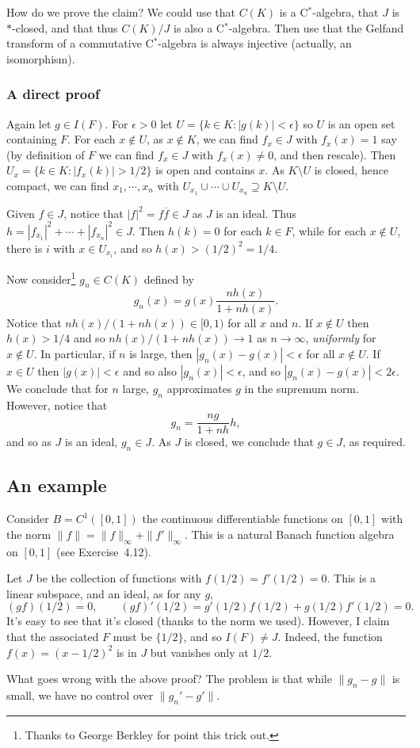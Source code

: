 \documentclass[twoside,12pt,a4paper]{article}
\theoremstyle{plain}
\theoremstyle{definition}
\begin{document}
How do we prove the claim?  We could use that $C(K)$ is a C$^*$-algebra,
that $J$ is $*$-closed, and that thus $C(K)/J$ is also a C$^*$-algebra.
Then use that the Gelfand transform of a commutative C$^*$-algebra is
always injective (actually, an isomorphism).

\subsubsection{A direct proof}

Again let $g\in I(F)$.  For $\epsilon>0$ let $U=\{ k\in K : |g(k)|<\epsilon\}$
so $U$ is an open set containing $F$.  For each $x\not\in U$, as $x\not\in K$,
we can find $f_x\in J$ with $f_x(x)=1$ say (by definition of $F$ we can find
$f_x\in J$ with $f_x(x)\not=0$, and then rescale).  Then $U_x=\{ k\in K:
|f_x(k)|>1/2 \}$ is open and contains $x$.  As $K\setminus U$ is
closed, hence compact, we can find $x_1,\cdots,x_n$ with $U_{x_1}\cup
\cdots\cup U_{x_n} \supseteq K\setminus U$.

Given $f\in J$, notice that $|f|^2 = f \overline{f} \in J$ as $J$ is an ideal.
Thus $h = |f_{x_1}|^2 + \cdots + |f_{x_n}|^2\in J$.  Then $h(k)=0$ for each
$k\in F$, while for each $x\not\in U$, there is $i$ with $x\in U_{x_i}$, and so
$h(x)>(1/2)^2 = 1/4$.  

Now consider\footnote{Thanks to George Berkley for point this trick out.}
$g_n\in C(K)$ defined by
\[ g_n(x) = g(x) \frac{n h(x)}{1+nh(x)}. \]
Notice that $nh(x)/(1+nh(x)) \in [0,1)$ for all $x$ and $n$.
If $x\not\in U$ then $h(x)>1/4$ and so $nh(x)/(1+nh(x)) \rightarrow 1$ as
$n\rightarrow\infty$, \emph{uniformly} for $x\not\in U$.  In particular, if
$n$ is large, then $|g_n(x)-g(x)| < \epsilon$ for all $x\not\in U$.
If $x\in U$ then $|g(x)|<\epsilon$ and so also $|g_n(x)|<\epsilon$, and so
$|g_n(x)-g(x)| < 2\epsilon$.  We conclude that for $n$ large, $g_n$ approximates
$g$ in the supremum norm.  However, notice that
\[ g_n = \frac{ng}{1+nh} h, \]
and so as $J$ is an ideal, $g_n\in J$.
As $J$ is closed, we conclude that $g\in J$, as required.

\subsection{An example}

Consider $B=C^1([0,1])$ the continuous
differentiable functions on $[0,1]$ with the norm $\|f\|=\|f\|_\infty + 
\|f'\|_\infty$.  This is a natural Banach function algebra on $[0,1]$
(see Exercise~4.12).

Let $J$ be the collection of functions with $f(1/2)=f'(1/2)=0$.
This is a linear subspace, and an ideal, as for any $g$,
\[ (gf)(1/2) =0, \qquad (gf)'(1/2) = g'(1/2)f(1/2) + g(1/2) f'(1/2) =0. \]
It's easy to see that it's closed (thanks to the norm we used).  However,
I claim that the associated $F$ must be $\{1/2\}$, and so $I(F)\not=J$.
Indeed, the function $f(x)=(x-1/2)^2$ is in $J$ but vanishes only at $1/2$.

What goes wrong with the above proof?  The problem is that while $\|g_n-g\|$
is small, we have no control over $\| g_n' - g'\|$.
\end{document}
